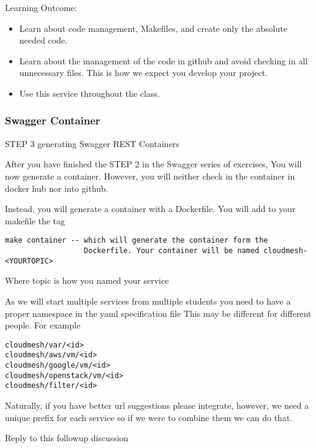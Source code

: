 Learning Outcome:

\begin{itemize}
\item Learn about code management, Makefiles, and create only the
  absolute needed code. 
\item Learn about the management of the code in github and avoid
  checking in all unnecessary files. This is how we expect you develop
  your project.
\item Use this service throughout the class.
\end{itemize}

\subsubsection{Swagger Container}

\begin{exercise}

STEP 3 generating Swagger REST Containers

After you have finished the STEP 2 in the Swagger series of exercises,
You will now generate a container. However, you will neither check in
the container in docker hub nor into github.

 

Instead, you will generate a container with a Dockerfile. You will add
to your makefile the tag

 
\begin{lstlisting}
make container -- which will generate the container form the
                  Dockerfile. Your container will be named cloudmesh-<YOURTOPIC>
\end{lstlisting}

Where topic is how you named your service

As we will start multiple services from multiple students you need to
have a proper namespace in the yaml specification file This may be
different for different people. For example

 
\begin{lstlisting}
cloudmesh/var/<id>
cloudmesh/aws/vm/<id>
cloudmesh/google/vm/<id>
cloudmesh/openstack/vm/<id>
cloudmesh/filter/<id>
\end{lstlisting}

 

Naturally, if you have better url suggestions please integrate,
however, we need a unique prefix for each service so if we were to
combine them we can do that.

Reply to this followup discussion
\end{exercise}


